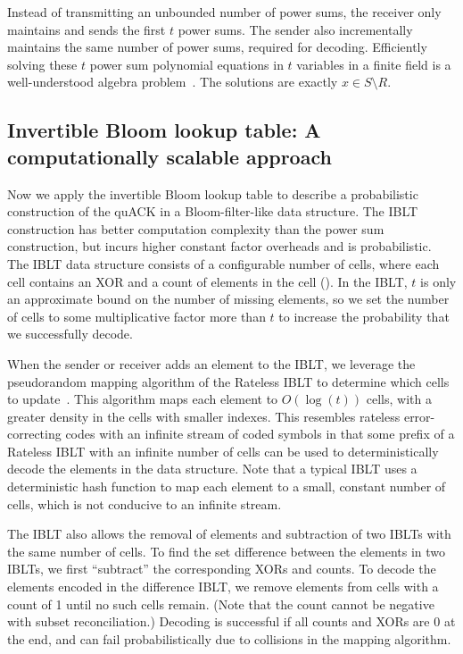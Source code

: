 Instead of transmitting an unbounded number of power sums, the receiver only
maintains and sends the first $t$ power sums. The sender also incrementally
maintains the same number of power sums, required for decoding.
Efficiently solving these $t$
power sum polynomial equations in $t$ variables in a finite field is a
well-understood algebra problem~\cite{eppstein2011straggler}. The solutions are
exactly $x \in S \setminus R$.

\subsection{Invertible Bloom lookup table: A computationally scalable approach}
\label{sec:quack:constructions:iblt}

Now we apply the invertible Bloom lookup table to describe a probabilistic
construction of the quACK in a Bloom-filter-like data structure. The IBLT
construction has better computation complexity than the power sum construction,
but incurs higher constant factor overheads and is probabilistic. The IBLT data
structure consists of a configurable number of cells, where each cell contains
an XOR and a count of elements in the cell (). In the IBLT, $t$ is only an
approximate bound on the number of missing elements, so we set the number of
cells to some multiplicative factor more than $t$ to increase the probability
that we successfully decode.



When the sender or receiver adds an element to the IBLT, we leverage the
pseudorandom mapping algorithm of the Rateless IBLT to determine which cells
to update~\cite{yang2024practical}. This algorithm maps each element to
$O(\log(t))$ cells, with a greater density in the cells with smaller indexes.
This resembles rateless error-correcting codes with an infinite stream of coded
symbols in that some prefix of a Rateless IBLT with an infinite number of cells
can be used to deterministically decode the elements in the data structure.
Note that a typical IBLT uses a deterministic hash function to map each element
to a small, constant number of cells, which is not conducive to an infinite
stream.

The IBLT also allows the removal of elements and subtraction of two IBLTs with
the same number of cells. To find the set difference between the elements in
two IBLTs, we first ``subtract'' the corresponding XORs and counts. To decode
the elements encoded in the difference IBLT, we remove elements from cells with
a count of 1 until no such cells remain. (Note that the count cannot be
negative with subset reconciliation.) Decoding is successful if all counts
and XORs are 0 at the end, and can fail probabilistically due to collisions in
the mapping algorithm.


